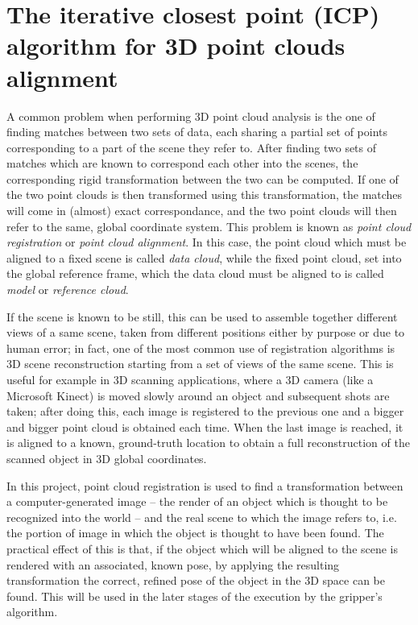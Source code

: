 \section{The iterative closest point (ICP) algorithm for 3D point clouds
alignment}

A common problem when performing 3D point cloud analysis is the one of finding
matches between two sets of data, each sharing a partial set of points
corresponding to a part of the scene they refer to. After finding two sets of
matches which are known to correspond each other into the scenes, the
corresponding rigid transformation between the two can be computed. If one of the two
point clouds is then transformed using this transformation, the matches will
come in (almost) exact correspondance, and the two point clouds will then refer
to the same, global coordinate system. This problem is known as
\emph{point cloud registration} or \emph{point cloud alignment}. In this case,
the point cloud which must be aligned to a fixed scene is called \emph{data
cloud}, while the fixed point cloud, set into the global reference frame, 
which the data cloud must be aligned to is called \emph{model} or
\emph{reference cloud}.

If the scene is known to be still, this can be used to assemble together
different views of a same scene,
taken from different positions either by purpose or due to human error; in
fact, one of the most common use of registration algorithms is 3D scene
reconstruction starting from a set of views of the same scene. This is useful
for example in 3D scanning applications, where a 3D camera (like a Microsoft
Kinect) is moved slowly around an object and subsequent shots are taken;
after doing this, each image is registered to the previous one and a
bigger and bigger point cloud is obtained each time. When the last image is
reached, it is aligned to a known, ground-truth location to obtain a full
reconstruction of the scanned object in 3D global coordinates.

In this project, point cloud registration is used to find a transformation
between a computer-generated image -- the render of an object which is thought
to be recognized into the world -- and the real scene to which the image refers
to, i.e. the portion of image in which the object is thought to have been
found. The practical effect of this is that, if the object which will be
aligned to the scene is rendered with an associated, known pose, by applying
the resulting transformation the correct, refined pose of the object in the 3D
space can be found. This will be used in the later stages of the execution by
the gripper's algorithm.

